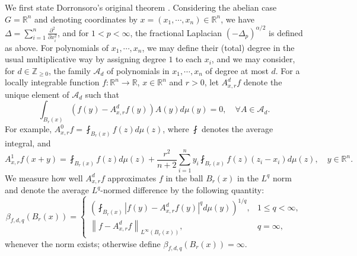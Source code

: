 \documentclass[11pt,reqno]{amsart}
\newcommand{\1}{\mathbf 1}
\begin{document}
We first state Dorronsoro's original theorem \cite[Theorem 2, Theorem 6]{dorronsoro1985characterization}. Considering the abelian case $G=\mathbb{R}^n$ and denoting coordinates by $x=\left(x_1,\cdots,x_n\right)\in \mathbb{R}^n$, we have $\Delta=\sum_{i=1}^n \frac{\partial^2}{\partial x_i^2}$, and for $1<p<\infty$, the fractional Laplacian $\left(-\Delta_p\right)^{\alpha/2}$ is defined as above. For polynomials of $x_1,\cdots,x_n$, we may define their (total) degree in the usual multiplicative way by assigning degree $1$ to each $x_i$, and we may consider, for $d\in \mathbb{Z}_{\ge 0}$, the family $\mathcal{A}_d$ of polynomials in $x_1,\cdots,x_n$ of degree at most $d$. For a locally integrable function $f:\mathbb{R}^n\to\mathbb{R}$, $x\in \mathbb{R}^n$ and $r>0$, let $A^d_{x,r}f$ denote the unique element of $\mathcal{A}_d$ such that
\[
\int_{B_r\left(x\right)}\left(f\left(y\right)-A^d_{x,r}f\left(y\right)\right)A\left(y\right)d\mu\left(y\right)=0,\quad \forall A\in \mathcal{A}_d.
\]
For example, $A^0_{x,r}f=\fint_{B_r\left(x\right)} f\left(z\right)d\mu\left(z\right)$, where $\fint$ denotes the average integral, and
\begin{equation*}
A^1_{x,r}f\left(x+y\right) = \fint_{B_r\left(x\right)}f\left(z\right)d\mu\left(z\right) + \frac{r^2}{n+2}\sum_{i=1}^{n}y_i\fint_{B_r\left(x\right)} f\left(z\right)\left(z_{i}-x_{i}\right)d\mu\left(z\right), \quad y \in \mathbb{R}^n.
\end{equation*}
We measure how well $A^d_{x,r}f$ approximates $f$ in the ball $B_r\left(x\right)$ in the $L^q$ norm and denote the average $L^q$-normed difference by the following quantity:
\[
\beta_{f,d,q}\left(B_r\left(x\right)\right)=
\begin{cases}
\left(\fint_{B_r\left(x\right)}\left|f\left(y\right)-A^d_{x,r}f\left(y\right)\right|^q d\mu\left(y\right)\right)^{1/q},& 1\le q<\infty,\\
\left\|f-A^d_{x,r}f\right\|_{L^\infty\left(B_r\left(x\right)\right)},& q=\infty,
\end{cases}
\]
whenever the norm exists; otherwise define $\beta_{f,d,q}\left(B_r\left(x\right)\right)=\infty$. 
\end{document}
